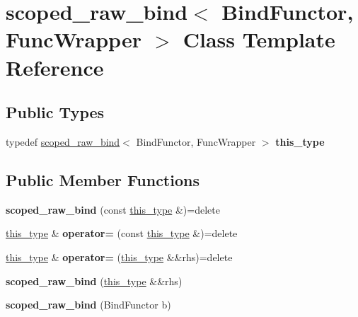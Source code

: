 \hypertarget{classscoped__raw__bind}{}\section{scoped\+\_\+raw\+\_\+bind$<$ Bind\+Functor, Func\+Wrapper $>$ Class Template Reference}
\label{classscoped__raw__bind}
\subsection*{Public Types}
\begin{DoxyCompactItemize}
\item 
\mbox{\label{classscoped__raw__bind_a23ec5a3a4650adf7832ddac54e95e041}} 
typedef \mbox{\hyperlink{classscoped__raw__bind}{scoped\+\_\+raw\+\_\+bind}}$<$ Bind\+Functor, Func\+Wrapper $>$ {\bfseries this\+\_\+type}
\end{DoxyCompactItemize}
\subsection*{Public Member Functions}
\begin{DoxyCompactItemize}
\item 
\mbox{\label{classscoped__raw__bind_a7ad356b68594a9969778dd1511487d0a}} 
{\bfseries scoped\+\_\+raw\+\_\+bind} (const \mbox{\hyperlink{classscoped__raw__bind}{this\+\_\+type}} \&)=delete
\item 
\mbox{\label{classscoped__raw__bind_a7d77ff964c7e7f5419b6d1f44ef75400}} 
\mbox{\hyperlink{classscoped__raw__bind}{this\+\_\+type}} \& {\bfseries operator=} (const \mbox{\hyperlink{classscoped__raw__bind}{this\+\_\+type}} \&)=delete
\item 
\mbox{\label{classscoped__raw__bind_a124e72f949a6bd61f9f4e2f2a6c019cb}} 
\mbox{\hyperlink{classscoped__raw__bind}{this\+\_\+type}} \& {\bfseries operator=} (\mbox{\hyperlink{classscoped__raw__bind}{this\+\_\+type}} \&\&rhs)=delete
\item 
\mbox{\label{classscoped__raw__bind_adcb8ba8e07362225e6ca0db4d09a08a2}} 
{\bfseries scoped\+\_\+raw\+\_\+bind} (\mbox{\hyperlink{classscoped__raw__bind}{this\+\_\+type}} \&\&rhs)
\item 
\mbox{\label{classscoped__raw__bind_a05ca81d7da6b7745418cbc0da7b9fe3d}} 
{\bfseries scoped\+\_\+raw\+\_\+bind} (Bind\+Functor b)
\end{DoxyCompactItemize}
